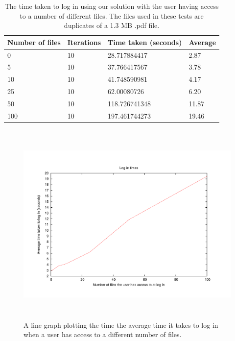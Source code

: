\documentclass[12pt, titlepage]{article}
\begin{document}
\begin{table}[H]
	\begin{center}
    	\begin{tabular}{ | l | l | l | l |}
    \hline
    \textbf{Number of files} & \textbf{Iterations} & \textbf{Time taken 		(seconds)} & \textbf{Average} \\ \hline
    
    0  & 10 & 28.717884417 & 2.87 \\ \hline
    5  & 10 & 37.766417567 & 3.78 \\ \hline
    10 & 10 & 41.748590981 & 4.17 \\ \hline
    25 & 10 & 62.00080726 & 6.20 \\ \hline
    50 & 10 & 118.726741348 & 11.87 \\ \hline
    100 & 10 & 197.461744273 & 19.46 \\ \hline
    
    \end{tabular}
    \caption{The time taken to log in using our solution with the user having access to a number of different files. The files used in these tests are duplicates of a 1.3 MB .pdf file.}
    \label{tab:loginBenchmark}
   \end{center}
\end{table}
    
\begin{figure}[H]
\centerline{\includegraphics[height=4.0in,width=7in,angle=0]{plots/login/loginTimes.pdf}}
\caption{A line graph plotting the time the average time it takes to log in when a user has access to a different number of files.}
\label{fig:loginLineGraph}
\end{figure}
\end{document}
